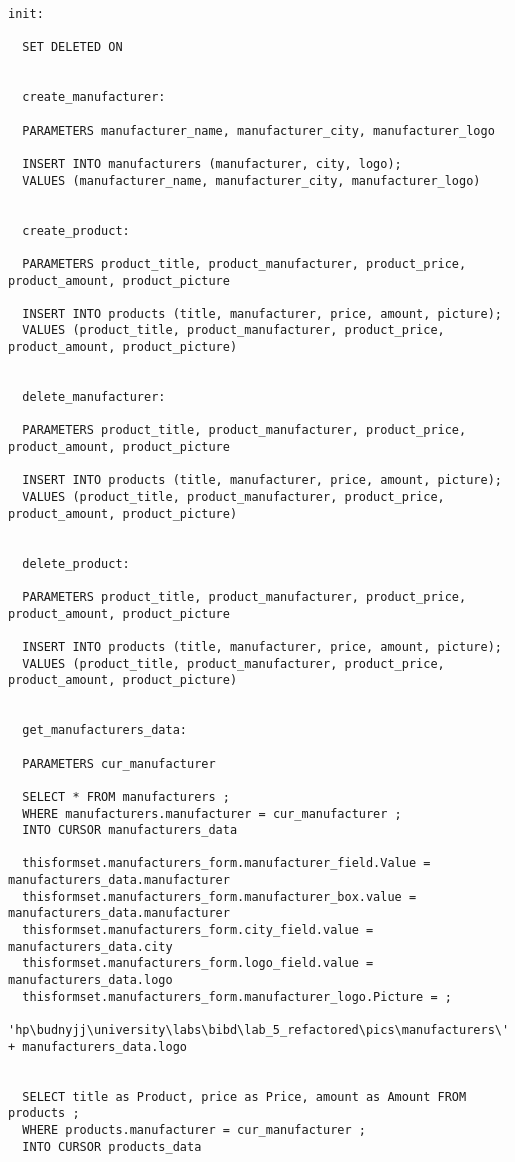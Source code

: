 \begin{lstlisting}[caption=crud\_formset\_procedures]
  init:

  SET DELETED ON


  create_manufacturer:

  PARAMETERS manufacturer_name, manufacturer_city, manufacturer_logo

  INSERT INTO manufacturers (manufacturer, city, logo);
  VALUES (manufacturer_name, manufacturer_city, manufacturer_logo)


  create_product:

  PARAMETERS product_title, product_manufacturer, product_price, product_amount, product_picture

  INSERT INTO products (title, manufacturer, price, amount, picture);
  VALUES (product_title, product_manufacturer, product_price, product_amount, product_picture)


  delete_manufacturer:

  PARAMETERS product_title, product_manufacturer, product_price, product_amount, product_picture

  INSERT INTO products (title, manufacturer, price, amount, picture);
  VALUES (product_title, product_manufacturer, product_price, product_amount, product_picture)


  delete_product:

  PARAMETERS product_title, product_manufacturer, product_price, product_amount, product_picture

  INSERT INTO products (title, manufacturer, price, amount, picture);
  VALUES (product_title, product_manufacturer, product_price, product_amount, product_picture)


  get_manufacturers_data:

  PARAMETERS cur_manufacturer

  SELECT * FROM manufacturers ;
  WHERE manufacturers.manufacturer = cur_manufacturer ;
  INTO CURSOR manufacturers_data

  thisformset.manufacturers_form.manufacturer_field.Value = manufacturers_data.manufacturer
  thisformset.manufacturers_form.manufacturer_box.value = manufacturers_data.manufacturer
  thisformset.manufacturers_form.city_field.value = manufacturers_data.city
  thisformset.manufacturers_form.logo_field.value = manufacturers_data.logo
  thisformset.manufacturers_form.manufacturer_logo.Picture = ;
  'hp\budnyjj\university\labs\bibd\lab_5_refactored\pics\manufacturers\' + manufacturers_data.logo


  SELECT title as Product, price as Price, amount as Amount FROM products ; 
  WHERE products.manufacturer = cur_manufacturer ;
  INTO CURSOR products_data


\end{lstlisting}
